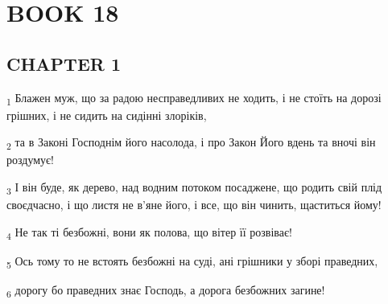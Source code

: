 \section{BOOK 18}
\subsection{CHAPTER 1}
\begin{tcolorbox}
\textsubscript{1} Блажен муж, що за радою несправедливих не ходить, і не стоїть на дорозі грішних, і не сидить на сидінні злоріків,
\end{tcolorbox}
\begin{tcolorbox}
\textsubscript{2} та в Законі Господнім його насолода, і про Закон Його вдень та вночі він роздумує!
\end{tcolorbox}
\begin{tcolorbox}
\textsubscript{3} І він буде, як дерево, над водним потоком посаджене, що родить свій плід своєдчасно, і що листя не в'яне його, і все, що він чинить, щаститься йому!
\end{tcolorbox}
\begin{tcolorbox}
\textsubscript{4} Не так ті безбожні, вони як полова, що вітер її розвіває!
\end{tcolorbox}
\begin{tcolorbox}
\textsubscript{5} Ось тому то не встоять безбожні на суді, ані грішники у зборі праведних,
\end{tcolorbox}
\begin{tcolorbox}
\textsubscript{6} дорогу бо праведних знає Господь, а дорога безбожних загине!
\end{tcolorbox}
